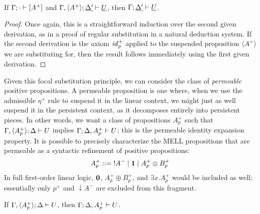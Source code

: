 \bigskip
\begin{theorem}
\label{thm:fsubst-posper}~\\
If ${\Gamma};{\cdot} \vdash {[A^+]} \mathstrut$ 
and ${\Gamma, \langle A^+ \rangle};{\underline{\Delta'}} \vdash {\underline{U}} \mathstrut$, 
then ${\Gamma};{\underline{\Delta'}} \vdash {\underline{U}} \mathstrut$.
\end{theorem}

\begin{proof}
  Once again, this is a straightforward induction over the second
  given derivation, as in a proof of regular substitution in a natural
  deduction system. If the second derivation is the axiom ${\it
    id}_p^+$ applied to the suspended proposition $\langle A^+
  \rangle$ we are substituting for, then the result follows
  immediately using the first given derivation.
\end{proof}

Given this focal substitution principle, we can consider the class of
{\it permeable} positive  propositions. A permeable 
proposition is one where, when we use the admissible $\eta^+$ rule to
suspend it in the linear context, we might just as well suspend it in
the persistent context, as it decomposes entirely into persistent
pieces. In other words, we want a class of propositions $A^+_p$ such
that ${\Gamma, \langle A^+_p \rangle};{\Delta} \vdash {U} \mathstrut$ implies
${\Gamma};{\Delta, A^+_p} \vdash {U} \mathstrut$; this is the permeable identity
expansion property. It is possible to precisely characterize the MELL
propositions that are permeable as a syntactic refinement of positive
propositions:
\[
A^+_p ::= {!}A^- \mid \mathbf{1} \mid A^+_p \otimes B^+_p
\]
In full first-order linear logic, $\mathbf{0}$, $A^+_p \oplus B^+_p$, and
$\exists x. A^+_p$ would be included as well; essentially only $p^+$
and ${\downarrow}A^-$ are excluded from this fragment. 
%

\bigskip
\begin{theorem}\label{thm:permident}
If ${\Gamma, \langle A^+_p \rangle};{\Delta} \vdash {U} \mathstrut$, 
then ${\Gamma};{\Delta, A^+_p} \vdash {U} \mathstrut$.
\end{theorem}

